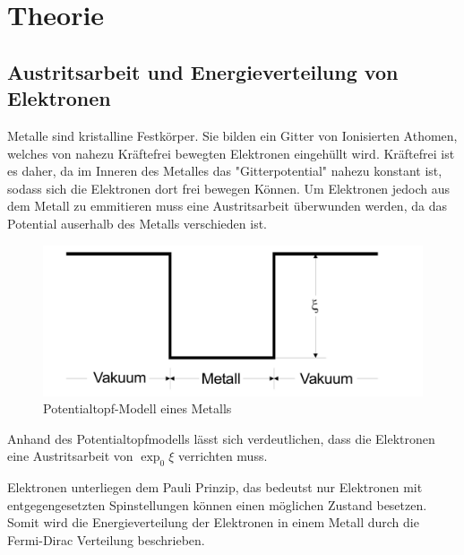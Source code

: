 \section{Theorie}
\label{sec:Theorie}
\subsection{Austritsarbeit und Energieverteilung von Elektronen}
Metalle sind kristalline Festkörper. Sie bilden ein Gitter von 
Ionisierten Athomen, welches von nahezu Kräftefrei bewegten Elektronen 
eingehüllt wird. Kräftefrei ist es daher, da im Inneren des Metalles das "Gitterpotential"
nahezu konstant ist, sodass sich die Elektronen dort frei bewegen Können. Um Elektronen jedoch 
aus dem Metall zu emmitieren muss eine Austritsarbeit überwunden werden, da das Potential auserhalb 
des Metalls verschieden ist.
\begin{figure}[H]
    \centering
        \centering
        \includegraphics[width=\textwidth]{Bilder/potentialtopf.jpg}
        \caption{Potentialtopf-Modell eines Metalls}
    \hfill
    \label{fig:phasendiagramm}
\end{figure}
Anhand des Potentialtopfmodells lässt sich verdeutlichen, dass die Elektronen eine Austritsarbeit von 
$\exp _0 \xi$ verrichten muss.

Elektronen unterliegen dem Pauli Prinzip, das bedeutst nur Elektronen mit entgegengesetzten Spinstellungen können einen möglichen Zustand besetzen. 
Somit wird die Energieverteilung der Elektronen in einem Metall durch die Fermi-Dirac Verteilung beschrieben.

